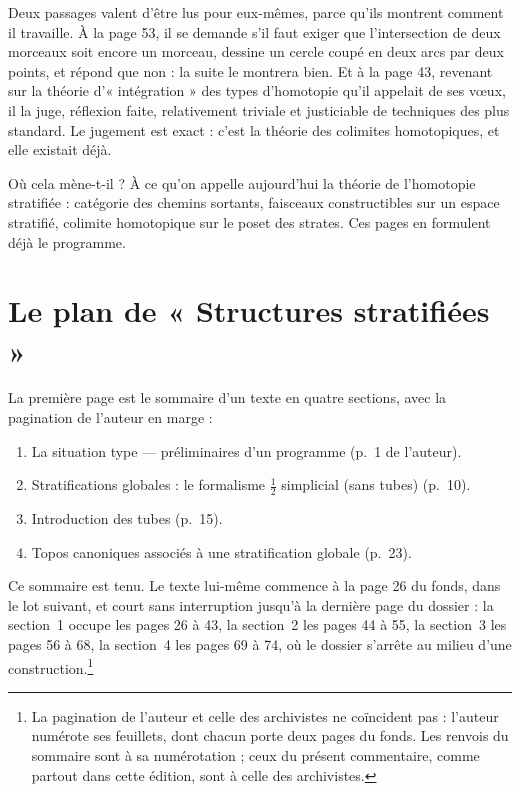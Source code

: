 \documentclass[11pt,a4paper]{article}
\begin{document}
\begin{resume}
Deux passages valent d'être lus pour eux-mêmes, parce qu'ils montrent comment
il travaille. À la page 53, il se demande s'il faut exiger que l'intersection
de deux morceaux soit encore un morceau, dessine un cercle coupé en deux arcs
par deux points, et répond que non : la suite le montrera bien. Et à la page
43, revenant sur la théorie d'« intégration » des types d'homotopie qu'il
appelait de ses vœux, il la juge, réflexion faite, relativement triviale et
justiciable de techniques des plus standard. Le jugement est exact : c'est la
théorie des colimites homotopiques, et elle existait déjà.

Où cela mène-t-il ? À ce qu'on appelle aujourd'hui la théorie de l'homotopie
stratifiée : catégorie des chemins sortants, faisceaux constructibles sur un
espace stratifié, colimite homotopique sur le poset des strates. Ces pages en
formulent déjà le programme.

\end{resume}

\section*{Le plan de « Structures stratifiées »}

La première page est le sommaire d'un texte en quatre sections, avec la
pagination de l'auteur en marge :

\begin{enumerate}
  \item La situation type — préliminaires d'un programme (p.~1 de l'auteur).
  \item Stratifications globales : le formalisme $\tfrac{1}{2}$ simplicial
    (sans tubes) (p.~10).
  \item Introduction des tubes (p.~15).
  \item Topos canoniques associés à une stratification globale (p.~23).
\end{enumerate}

Ce sommaire est tenu. Le texte lui-même commence à la page 26 du fonds, dans le
lot suivant, et court sans interruption jusqu'à la dernière page du dossier : la
section~1 occupe les pages 26 à 43, la section~2 les pages 44 à 55, la
section~3 les pages 56 à 68, la section~4 les pages 69 à 74, où le dossier
s'arrête au milieu d'une construction.\footnote{La pagination de l'auteur et
celle des archivistes ne coïncident pas : l'auteur numérote ses feuillets, dont
chacun porte deux pages du fonds. Les renvois du sommaire sont à sa
numérotation ; ceux du présent commentaire, comme partout dans cette édition,
sont à celle des archivistes.}
\end{document}
